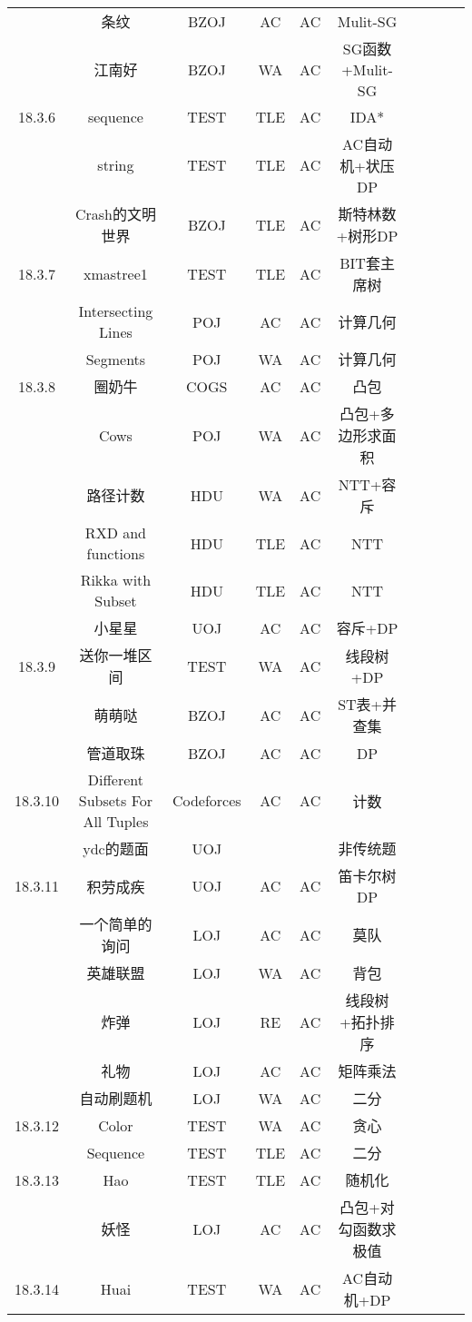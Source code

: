 \documentclass[landscape]{article}
\begin{document}
\begin{longtable}{cccccccccc}
  & 条纹 & BZOJ & AC & AC & Mulit-SG\\
  & 江南好 & BZOJ & WA & AC & SG函数+Mulit-SG\\
  \hline
  18.3.6 & sequence & TEST & TLE & AC & IDA*\\
  & string & TEST & TLE & AC & AC自动机+状压DP\\
  & Crash的文明世界 & BZOJ & TLE & AC & 斯特林数+树形DP\\
  \hline
  18.3.7 & xmastree1 & TEST & TLE & AC & BIT套主席树\\
  & Intersecting Lines & POJ & AC & AC & 计算几何\\
  & Segments & POJ & WA & AC & 计算几何\\
  \hline
  18.3.8 & 圈奶牛 & COGS & AC & AC & 凸包 \\
  & Cows & POJ & WA & AC & 凸包+多边形求面积 \\
  & 路径计数 & HDU & WA & AC & NTT+容斥 \\
  & RXD and functions & HDU & TLE & AC & NTT \\
  & Rikka with Subset & HDU & TLE & AC & NTT \\
  & 小星星 & UOJ & AC & AC & 容斥+DP\\
  \hline
  18.3.9 & 送你一堆区间 & TEST & WA & AC & 线段树+DP\\
  & 萌萌哒 & BZOJ & AC & AC & ST表+并查集\\
  & 管道取珠 & BZOJ & AC & AC & DP\\
  \hline
  18.3.10 & Different Subsets For All Tuples & Codeforces & AC & AC & 计数\\
  & ydc的题面 & UOJ & & &非传统题\\
  \hline
  18.3.11 & 积劳成疾 & UOJ & AC & AC & 笛卡尔树DP\\
  & 一个简单的询问 & LOJ & AC & AC & 莫队\\
  & 英雄联盟 & LOJ & WA & AC & 背包\\
  & 炸弹 & LOJ & RE & AC & 线段树+拓扑排序\\
  & 礼物 & LOJ & AC & AC & 矩阵乘法\\
  & 自动刷题机 & LOJ & WA & AC & 二分\\
  \hline
  18.3.12 & Color & TEST & WA & AC & 贪心\\
  & Sequence & TEST & TLE & AC & 二分\\
  \hline
  18.3.13 & Hao & TEST & TLE & AC & 随机化\\
  & 妖怪 & LOJ & AC & AC & 凸包+对勾函数求极值\\
  \hline
  18.3.14 & Huai & TEST & WA & AC & AC自动机+DP\\

\end{longtable}
\end{document}
